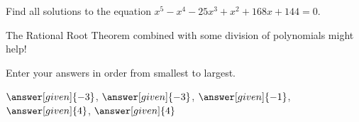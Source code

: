 \documentclass[nooutcomes]{ximera}
\begin{document}
\begin{problem}
Find all solutions to the equation $x^5-x^4-25x^3+x^2+168x+144=0$. 
\begin{hint} 
The Rational Root Theorem combined with some division of polynomials might help!
\end{hint}
Enter your answers in order from smallest to largest.

\begin{prompt}
$\answer[given]{-3}$, $\answer[given]{-3}$, $\answer[given]{-1}$, $\answer[given]{4}$, $\answer[given]{4}$
\end{prompt}
\end{problem}
\end{document}
